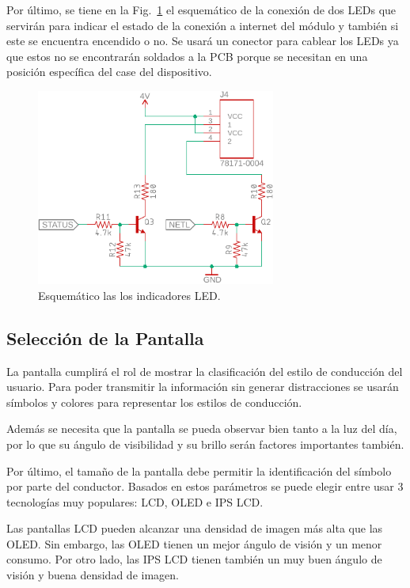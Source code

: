 Por último, se tiene en la Fig.~\ref{fig:GSM_LED_esquem} el esquemático de la conexión de dos LEDs que servirán para indicar el estado de la conexión a internet del módulo y también si este se encuentra encendido o no. Se usará un conector para cablear los LEDs ya que estos no se encontrarán soldados a la PCB porque se necesitan en una posición específica del case del dispositivo.

\begin{figure}[htbp!]
\centering
\includegraphics[width=0.7\textwidth]{GSM_LED_esquem.pdf}
\caption{Esquemático las los indicadores LED.}
\label{fig:GSM_LED_esquem}
\end{figure}

\subsection{Selección de la Pantalla}
La pantalla cumplirá el rol de mostrar la clasificación del estilo de conducción del usuario. Para poder transmitir la información sin generar distracciones se usarán símbolos y colores para representar los estilos de conducción.

Además se necesita que la pantalla se pueda observar bien tanto a la luz del día, por lo que su ángulo de visibilidad y su brillo serán factores importantes también.

Por último, el tamaño de la pantalla debe permitir la identificación del símbolo por parte del conductor. Basados en estos parámetros se puede elegir entre usar 3 tecnologías muy populares: LCD, OLED e IPS LCD.

Las pantallas LCD pueden alcanzar una densidad de imagen más alta que las OLED. Sin embargo, las OLED tienen un mejor ángulo de visión y un menor consumo. Por otro lado, las IPS LCD tienen también un muy buen ángulo de visión y buena densidad de imagen.

